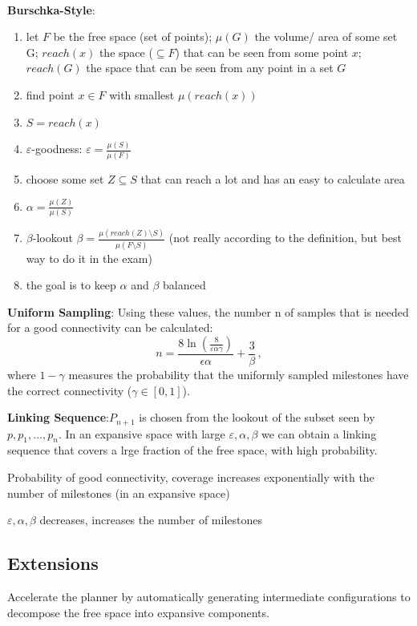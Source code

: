 \begin{multicols*}{2}
~\\
\textbf{Burschka-Style}:
\begin{enumerate}
	\item let $F$ be the free space (set of points); $\mu(G)$ the volume/ area of some set G; $reach(x)$ the space ($\subseteq F$) that can be seen from some point $x$; $reach(G)$ the space that can be seen from any point in a set $G$
	\item find point $x \in F$ with smallest $\mu(reach(x))$
	\item $S = reach(x)$
	\item $\varepsilon$-goodness: $\varepsilon = \frac{\mu(S)}{\mu(F)}$ 
	\item choose some set $Z \subseteq S$ that can reach a lot and has an easy to calculate area
	\item $\alpha = \frac{\mu(Z)}{\mu(S)}$
	\item $\beta$-lookout $\beta = \frac{\mu(reach(Z) \setminus S)}{\mu(F \setminus S)}$ (not really according to the definition, but best way to do it in the exam)
	\item the goal is to keep $\alpha$ and $\beta$ balanced
\end{enumerate}

\textbf{Uniform Sampling}: Using these values, the number n of samples that is needed for a good connectivity can be calculated:
\[ n= \frac{8 \ln (\frac{8}{\varepsilon\alpha\gamma})}{\epsilon\alpha} + \frac{3}{\beta} \,, \] 
where $1-\gamma$ measures the probability that the uniformly sampled milestones have the correct connectivity ($\gamma \in [0,1]$).

\textbf{Linking Sequence}:$P_{n+1}$ is chosen from the lookout of the subset seen by $p, p_1, ..., p_n$.
In an expansive space with large $\varepsilon,\alpha,\beta$ we can obtain a linking sequence that covers a lrge fraction of the free space, with high probability.

Probability of good connectivity, coverage increases exponentially with the number of milestones (in an expansive space)
	
$\varepsilon,\alpha,\beta$ decreases, increases the number of milestones

\subsection{Extensions}
Accelerate the planner by automatically generating
intermediate configurations to decompose the free
space into expansive components.


\end{multicols*}
